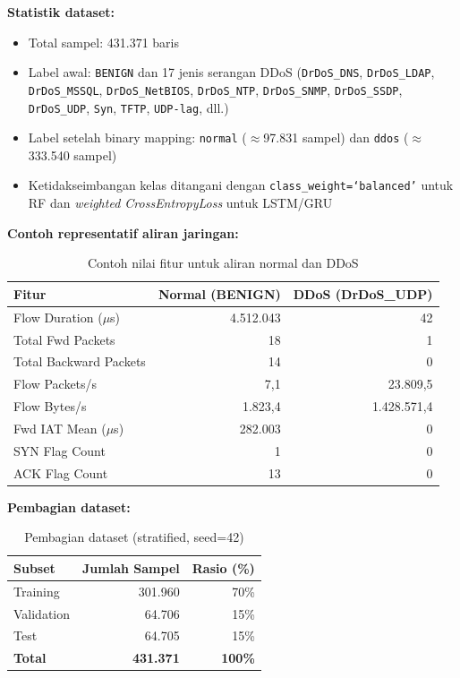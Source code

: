 \documentclass[11pt,a4paper,oneside]{report}
\begin{document}
\textbf{Statistik dataset:}
\begin{itemize}[leftmargin=*]
    \item Total sampel: 431.371 baris
    \item Label awal: \texttt{BENIGN} dan 17 jenis serangan DDoS (\texttt{DrDoS\_DNS}, \texttt{DrDoS\_LDAP}, \texttt{DrDoS\_MSSQL}, \texttt{DrDoS\_NetBIOS}, \texttt{DrDoS\_NTP}, \texttt{DrDoS\_SNMP}, \texttt{DrDoS\_SSDP}, \texttt{DrDoS\_UDP}, \texttt{Syn}, \texttt{TFTP}, \texttt{UDP-lag}, dll.)
    \item Label setelah binary mapping: \texttt{normal} ($\approx$97.831 sampel) dan \texttt{ddos} ($\approx$333.540 sampel)
    \item Ketidakseimbangan kelas ditangani dengan \texttt{class\_weight=`balanced'} untuk RF dan \textit{weighted CrossEntropyLoss} untuk LSTM/GRU
\end{itemize}

\textbf{Contoh representatif aliran jaringan:}
\begin{table}[h!]
\centering
\caption{Contoh nilai fitur untuk aliran normal dan DDoS}
\label{tab:contoh-sampel}
\begin{tabular}{lrr}
\toprule
\textbf{Fitur} & \textbf{Normal (BENIGN)} & \textbf{DDoS (DrDoS\_UDP)} \\
\midrule
Flow Duration ($\mu$s)         & 4.512.043 & 42 \\
Total Fwd Packets              & 18        & 1 \\
Total Backward Packets         & 14        & 0 \\
Flow Packets/s                 & 7,1       & 23.809,5 \\
Flow Bytes/s                   & 1.823,4   & 1.428.571,4 \\
Fwd IAT Mean ($\mu$s)         & 282.003   & 0 \\
SYN Flag Count                 & 1         & 0 \\
ACK Flag Count                 & 13        & 0 \\
\bottomrule
\end{tabular}
\end{table}

\textbf{Pembagian dataset:}

\begin{table}[h!]
\centering
\caption{Pembagian dataset (stratified, seed=42)}
\label{tab:split-data}
\begin{tabular}{lrr}
\toprule
\textbf{Subset} & \textbf{Jumlah Sampel} & \textbf{Rasio (\%)} \\
\midrule
Training   & 301.960 & 70\% \\
Validation & 64.706  & 15\% \\
Test       & 64.705  & 15\% \\
\midrule
\textbf{Total} & \textbf{431.371} & \textbf{100\%} \\
\bottomrule
\end{tabular}
\end{table}
\end{document}
